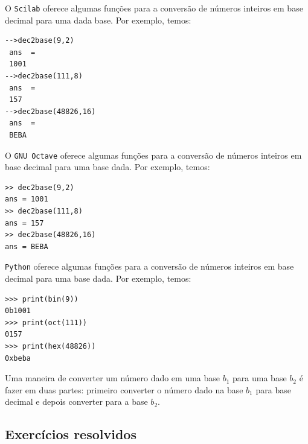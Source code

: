 \ifisscilab
\begin{obs}
  O \verb+Scilab+ oferece algumas funções para a conversão de números inteiros em base decimal para uma dada base. Por exemplo, temos:
\begin{verbatim}
-->dec2base(9,2)
 ans  =
 1001
-->dec2base(111,8)
 ans  =
 157
-->dec2base(48826,16)
 ans  =
 BEBA
\end{verbatim}
\end{obs}
\fi
\ifisoctave
\begin{obs}
  O \verb+GNU Octave+ oferece algumas funções para a conversão de números inteiros em base decimal para uma base dada. Por exemplo, temos:
\begin{verbatim}
>> dec2base(9,2)
ans = 1001
>> dec2base(111,8)
ans = 157
>> dec2base(48826,16)
ans = BEBA
\end{verbatim}
\end{obs}
\fi
\ifispython
\begin{obs}
  \verb+Python+ oferece algumas funções para a conversão de números inteiros em base decimal para uma base dada. Por exemplo, temos:
\begin{verbatim}
>>> print(bin(9))
0b1001
>>> print(oct(111))
0157
>>> print(hex(48826))
0xbeba
\end{verbatim}
\end{obs}
\fi

\begin{obs}
  Uma maneira de converter um número dado em uma base $b_1$ para uma base $b_2$ é fazer em duas partes: primeiro converter o número dado na base $b_1$ para base decimal e depois converter para a base $b_2$.
\end{obs}

\subsection*{Exercícios resolvidos}

\construirExeresol

